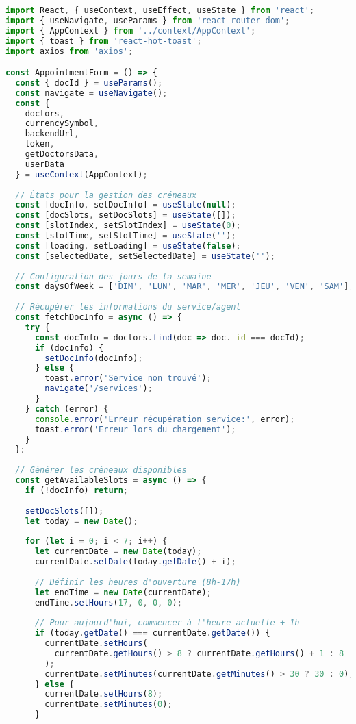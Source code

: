 \begin{lstlisting}[language=JavaScript, caption=AppointmentForm.jsx - Formulaire de réservation avec validation]
import React, { useContext, useEffect, useState } from 'react';
import { useNavigate, useParams } from 'react-router-dom';
import { AppContext } from '../context/AppContext';
import { toast } from 'react-hot-toast';
import axios from 'axios';

const AppointmentForm = () => {
  const { docId } = useParams();
  const navigate = useNavigate();
  const { 
    doctors, 
    currencySymbol, 
    backendUrl, 
    token, 
    getDoctorsData,
    userData 
  } = useContext(AppContext);
  
  // États pour la gestion des créneaux
  const [docInfo, setDocInfo] = useState(null);
  const [docSlots, setDocSlots] = useState([]);
  const [slotIndex, setSlotIndex] = useState(0);
  const [slotTime, setSlotTime] = useState('');
  const [loading, setLoading] = useState(false);
  const [selectedDate, setSelectedDate] = useState('');
  
  // Configuration des jours de la semaine
  const daysOfWeek = ['DIM', 'LUN', 'MAR', 'MER', 'JEU', 'VEN', 'SAM'];
  
  // Récupérer les informations du service/agent
  const fetchDocInfo = async () => {
    try {
      const docInfo = doctors.find(doc => doc._id === docId);
      if (docInfo) {
        setDocInfo(docInfo);
      } else {
        toast.error('Service non trouvé');
        navigate('/services');
      }
    } catch (error) {
      console.error('Erreur récupération service:', error);
      toast.error('Erreur lors du chargement');
    }
  };
  
  // Générer les créneaux disponibles
  const getAvailableSlots = async () => {
    if (!docInfo) return;
    
    setDocSlots([]);
    let today = new Date();
    
    for (let i = 0; i < 7; i++) {
      let currentDate = new Date(today);
      currentDate.setDate(today.getDate() + i);
      
      // Définir les heures d'ouverture (8h-17h)
      let endTime = new Date(currentDate);
      endTime.setHours(17, 0, 0, 0);
      
      // Pour aujourd'hui, commencer à l'heure actuelle + 1h
      if (today.getDate() === currentDate.getDate()) {
        currentDate.setHours(
          currentDate.getHours() > 8 ? currentDate.getHours() + 1 : 8
        );
        currentDate.setMinutes(currentDate.getMinutes() > 30 ? 30 : 0);
      } else {
        currentDate.setHours(8);
        currentDate.setMinutes(0);
      }
      

\end{lstlisting}
